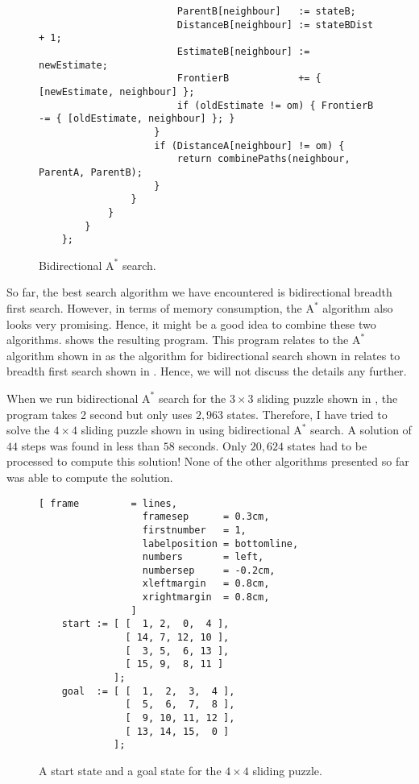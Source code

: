 \begin{figure}[!ht]
\begin{Verbatim}
                        ParentB[neighbour]   := stateB;
                        DistanceB[neighbour] := stateBDist + 1;
                        EstimateB[neighbour] := newEstimate;
                        FrontierB            += { [newEstimate, neighbour] };
                        if (oldEstimate != om) { FrontierB -= { [oldEstimate, neighbour] }; }
                    }
                    if (DistanceA[neighbour] != om) {
                        return combinePaths(neighbour, ParentA, ParentB);
                    }
                }        
            }
        }
    };
\end{Verbatim}
\vspace*{-0.3cm}
\caption{Bidirectional $\mathrm{A}^*$ search.}
\label{fig:a-star-bidirectional.stlx}
\end{figure}
So far, the best search algorithm we have encountered is bidirectional breadth first search.  However, in terms
of memory consumption, the $\mathrm{A}^*$ algorithm also looks very promising.  Hence, it might be a good idea
to combine these two algorithms.   shows the resulting program.  This program
relates to the $\mathrm{A}^*$ algorithm shown in  as the algorithm for bidirectional
search shown in  relates to breadth first search shown in .
Hence, we will not discuss the details any further.

When we run bidirectional $\mathrm{A}^*$ search for the $3 \times 3$ sliding puzzle shown in
, the program takes 2 second but only uses $2,963$ states.  Therefore, I have tried 
to solve the $4 \times 4$ sliding puzzle shown in  using
bidirectional $\mathrm{A}^*$ search.  A solution of $44$ steps was found in less than $58$ seconds.
Only $20,624$ states had to be processed to compute this solution!  None of the other algorithms presented so
far was able to compute the solution.

\begin{figure}[!ht]
\centering
\begin{Verbatim}[ frame         = lines, 
                  framesep      = 0.3cm, 
                  firstnumber   = 1,
                  labelposition = bottomline,
                  numbers       = left,
                  numbersep     = -0.2cm,
                  xleftmargin   = 0.8cm,
                  xrightmargin  = 0.8cm,
                ]
    start := [ [  1, 2,  0,  4 ],
               [ 14, 7, 12, 10 ],
               [  3, 5,  6, 13 ],
               [ 15, 9,  8, 11 ]
             ];
    goal  := [ [  1,  2,  3,  4 ],
               [  5,  6,  7,  8 ],
               [  9, 10, 11, 12 ],
               [ 13, 14, 15,  0 ]
             ];
\end{Verbatim}
\vspace*{-0.3cm}
\caption{A start state and a goal state for the $4 \times 4$ sliding puzzle.}
\label{fig:start-goal.stlx}
\end{figure}
